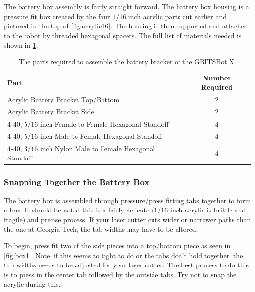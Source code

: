 The battery box assembly is fairly straight forward. The battery box housing is a pressure fit box created by the four $1/16$ inch acrylic parts cut earlier and pictured in the top of \cref{fig:acrylic16}. The housing is then supported and attached to the robot by threaded hexagonal spacers. The full list of materials needed is shown in \cref{tab:BBParts}.

 \begin{table}[h!]
 \centering
\begin{tabular}{p{3in}c}
\rowcolor[HTML]{C0C0C0} 
\textbf{Part}  & \textbf{Number Required} 		\\
Acrylic Battery Bracket Top/Bottom		& 2	\\
\rowcolor[HTML]{C0C0C0} 
Acrylic Battery Bracket Side				& 2	\\
4-40, $5/16$ inch Female to Female Hexagonal Standoff	& 4	\\
\rowcolor[HTML]{C0C0C0} 
4-40, $5/16$ inch Male to Female Hexagonal Standoff	& 4  \\
4-40, $3/16$ inch Nylon Male to Female Hexagonal Standoff	& 4
\end{tabular}
\caption{The parts required to assemble the battery bracket of the GRITSBot X. \label{tab:BBParts}}
\end{table}

\subsubsection{Snapping Together the Battery Box}
\label{sec:BBBox}

The battery box is assembled through pressure/press fitting tabs together to form a box. It should be noted this is a fairly delicate ($1/16$ inch acrylic is brittle and fragile) and precise process. If your laser cutter cuts wider or narrower paths than the one at Georgia Tech, the tab widths may have to be altered.

To begin, press fit two of the side pieces into a top/bottom piece as seen in \cref{fig:box1}. Note, if this seems to tight to do or the tabs don't hold together, the tab widths needs to be adjusted for your laser cutter. The best process to do this is to press in the center tab followed by the outside tabs. Try not to snap the acrylic during this.

